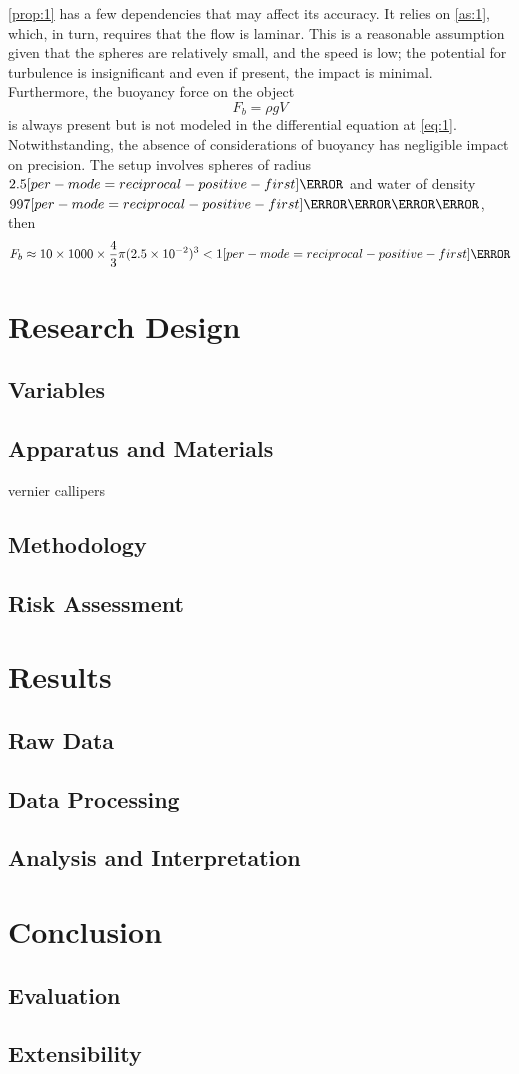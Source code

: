 \documentclass[a4paper,12pt]{article}
\let\oldsi\si
\renewcommand{\si}[1]{\oldsi[per-mode=reciprocal-positive-first]{#1}}
\begin{document}
\cref{prop:1} has a few dependencies that may affect its accuracy. It relies on \cref{as:1}, which, in turn, requires that the flow is laminar. This is a reasonable assumption given that the spheres are relatively small, and the speed is low; the potential for turbulence is insignificant and even if present, the impact is minimal. Furthermore, the buoyancy force on the object
$$F_b = \rho g V$$
is always present but is not modeled in the differential equation at \cref{eq:1}. Notwithstanding, the absence of considerations of buoyancy has negligible impact on precision. The setup involves spheres of radius $2.5\si{\cm}$ and water of density $997\si{\kg\per\m\cubed}$, then
$$F_b \approx 10 \times 1000 \times \frac{4}{3}\pi (2.5\times 10^{-2})^3 < 1\si{\N}$$
\pagebreak

\section{Research Design}

\subsection{Variables}

\subsection{Apparatus and Materials}
vernier callipers

\subsection{Methodology}

\subsection{Risk Assessment}

\section{Results}

\subsection{Raw Data}

\subsection{Data Processing}

\subsection{Analysis and Interpretation}

\section{Conclusion}

\subsection{Evaluation}

\subsection{Extensibility}

\pagebreak

\end{document}
